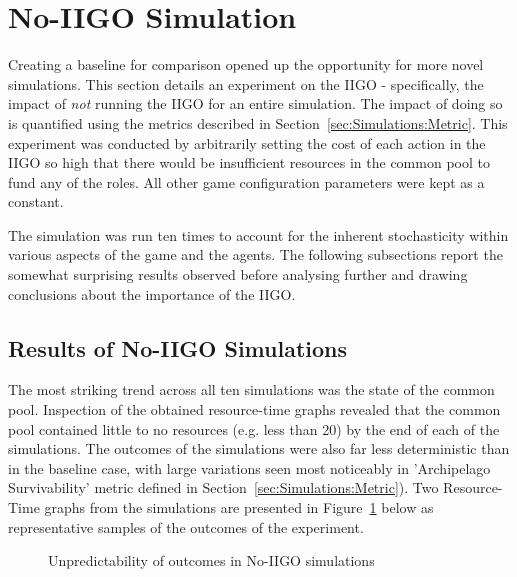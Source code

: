 \section{No-IIGO Simulation}
\label{sec:ResultsAndEval:no-iigo}

Creating a baseline for comparison opened up the opportunity for more novel simulations. This section details an experiment on the IIGO - specifically, the impact of \emph{not} running the IIGO for an entire simulation. The impact of doing so is quantified using the metrics described in Section~\ref{sec:Simulations:Metric}.
This experiment was conducted by arbitrarily setting the cost of each action in the IIGO so high that there would be insufficient resources in the common pool to fund any of the roles. All other game configuration parameters were kept as a constant. 

The simulation was run ten times to account for the inherent stochasticity within various aspects of the game and the agents. The following subsections report the somewhat surprising results observed before analysing further and drawing conclusions about the importance of the IIGO.

\subsection{Results of No-IIGO Simulations}
\label{subsec:ResultsAndEval:no-iigo:results}

The most striking trend across all ten simulations was the state of the common pool. Inspection of the obtained resource-time graphs revealed that the common pool contained little to no resources (e.g. less than 20) by the end of each of the simulations. The outcomes of the simulations were also far less deterministic than in the baseline case, with large variations seen most noticeably in 'Archipelago Survivability' metric defined in Section~\ref{sec:Simulations:Metric}).
Two Resource-Time graphs from the simulations are presented in Figure~\ref{fig:ResultsAndEval:no_iigo_unpredictable} below as representative samples of the outcomes of the experiment.


\begin{figure}[h]
    \centering
    \caption{Unpredictability of outcomes in No-IIGO simulations}
    \label{fig:ResultsAndEval:no_iigo_unpredictable}
\end{figure}

